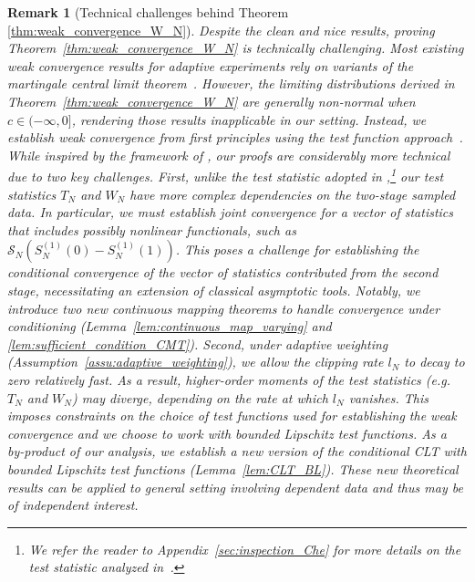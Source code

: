 \documentclass[12pt]{article}
\newtheorem{remark}{Remark}
\begin{document}
\begin{remark}[Technical challenges behind Theorem \ref{thm:weak_convergence_W_N}]\label{rmk:technical_challenges}
Despite the clean and nice results, proving Theorem~\ref{thm:weak_convergence_W_N} is technically challenging. Most existing weak convergence results for adaptive experiments rely on variants of the martingale central limit theorem~\citep{Zhang2020,Hadad2021}. 
However, the limiting distributions derived in Theorem~\ref{thm:weak_convergence_W_N} are generally non-normal when \( c \in (-\infty, 0] \), rendering those results inapplicable in our setting. 
Instead, we establish weak convergence from first principles using the \emph{test function approach}~\citep{Dudley_2002}. 
While inspired by the framework of \citet{che2023adaptive}, our proofs are considerably more technical due to two key challenges. 
First, unlike the test statistic adopted in \citet{che2023adaptive},\footnote{We refer the reader to Appendix~\ref{sec:inspection_Che} for more details on the test statistic analyzed in~\citet{che2023adaptive}.} our test statistics \( T_N \) and \( W_N \) have more complex dependencies on the two-stage sampled data. In particular, we must establish joint convergence for a vector of statistics that includes possibly nonlinear functionals, such as \( \mathcal{S}_N(S_N^{(1)}(0) - S_N^{(1)}(1)) \). This poses a challenge for establishing the conditional convergence of the vector of statistics contributed from the second stage, necessitating an extension of classical asymptotic tools. Notably, we introduce two new continuous mapping theorems to handle convergence under conditioning (Lemma~\ref{lem:continuous_map_varying} and \ref{lem:sufficient_condition_CMT}). Second, under adaptive weighting (Assumption~\ref{assu:adaptive_weighting}), we allow the clipping rate \( l_N \) to decay to zero relatively fast. As a result, higher-order moments of the test statistics (e.g. $T_N$ and $W_N$)  may diverge, depending on the rate at which \( l_N \) vanishes. This imposes constraints on the choice of test functions used for establishing the weak convergence and we choose to work with bounded Lipschitz test functions. As a by-product of our analysis, we establish a new version of the conditional CLT with bounded Lipschitz test functions (Lemma~\ref{lem:CLT_BL}). These new theoretical results can be applied to general setting involving dependent data and thus may be of independent interest.
\end{remark}
\end{document}
